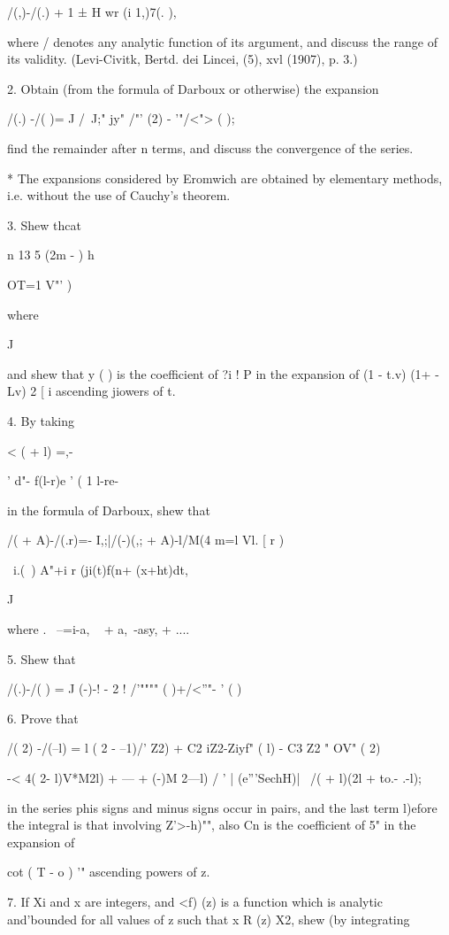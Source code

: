 {/(,)-/(.) + 1 ± H wr (i 1,)7(. ),

where / denotes any analytic function of its argument, and discuss the
range of its validity. (Levi-Civitk, Bertd. dei Lincei, (5), xvl
(1907), p. 3.)

2. Obtain (from the formula of Darboux or otherwise) the expansion

/(.) -/( )= J /~J;" jy" /"' (2) - '"/<"> ( );

find the remainder after n terms, and discuss the convergence of the
series.

* The expansions considered by Eromwich are obtained by elementary
methods, i.e. without the use of Cauchy's theorem.

%
%

3. Shew thcat

n 13 5 (2m - ) h

OT=1 V"' )

where

J

and shew that y ( ) is the coefficient of ?i ! P in the expansion of
(1 - t.v) (1+ - Lv) 2 [ i ascending jiowers of t.

4. By taking

< ( + l) =,-

' d"- f(l-r)e ' ( 1 l-re-

in the formula of Darboux, shew that

/( + A)-/(.r)=- I,;|/(-)(,; + A)-l/M(4 m=l Vl. [ r )

\ i.(\ ) A"+i r (ji(t)f(n+ (x+ht)dt,

J

where . \ --=i-a, ~ + a,~-asy, + ....

5. Shew that

/(.)-/( ) = J (-)-! - 2 ! /'"""" ( )+/<''"- ' ( )

6. Prove that

/( 2) -/(--l) = l ( 2 - --1)/' Z2) + C2 iZ2-Ziyf" ( l) - C3 Z2 " OV" (
2)

-< 4( 2- l)V*M2l) + --- + (-)M 2---l) / ' | (e'''SechH)| \ /( + l)(2l
+ to.- .-l);

in the series phis signs and minus signs occur in pairs, and the last
term l)efore the integral is that involving Z'>-h)"", also Cn is the
coefficient of 5" in the expansion of

cot ( T - o ) '" ascending powers of z. 

7. If Xi and x are integers, and <f) (z) is a function which is
analytic and'bounded for all values of z such that x R (z) X2, shew
(by integrating

}
